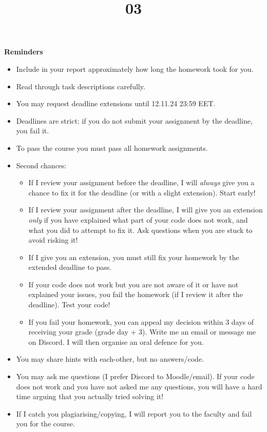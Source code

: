 \documentclass{homework}
\title{03}
\date{\DTMdate{2024-11-15}}
\begin{document}
\maketitle

\textbf{Reminders}

\begin{itemize}
  \item Include in your report approximately how long the homework took for you.
  \item Read through task descriptions carefully.
  \item You may request deadline extensions until 12.11.24 23:59 EET.
  \item Deadlines are strict: if you do not submit your assignment by the deadline, you fail it.
  \item To pass the course you must pass all homework assignments.
  \item Second chances:
  \begin{itemize}
    \item If I review your assignment before the deadline, I will \emph{always} give you a chance to fix it for the deadline (or with a slight extension).
    Start early!
    \item If I review your assignment after the deadline, I will give you an extension \emph{only} if you have explained what part of your code does not work, and what you did to attempt to fix it.
    Ask questions when you are stuck to avoid risking it!
    \item If I give you an extension, you must still fix your homework by the extended deadline to pass.
    \item If your code does not work but you are not aware of it or have not explained your issues, you fail the homework (if I review it after the deadline).
    Test your code!
    \item If you fail your homework, you can appeal my decision within 3 days of receiving your grade (grade day + 3).
    Write me an email or message me on Discord.
    I will then organise an oral defence for you.
  \end{itemize}
  \item You may share hints with each-other, but no answers/code.
  \item You may ask me questions (I prefer Discord to Moodle/email).
  If your code does not work and you have not asked me any questions, you will have a hard time arguing that you actually tried solving it!
  \item If I catch you plagiarising/copying, I will report you to the faculty and fail you for the course.
\end{itemize}
\end{document}
